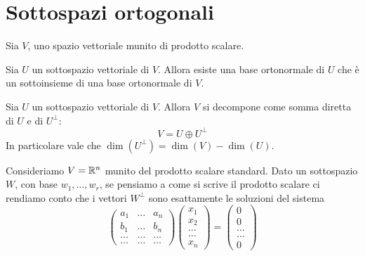 \section{Sottospazi ortogonali}
Sia $V$, uno spazio vettoriale munito di prodotto scalare.

\begin{proposition}
	Sia $U$ un sottospazio vettoriale di $V$. Allora esiste una base
	ortonormale di $U$ che è un sottoinsieme di una base ortonormale di $V$.
\end{proposition}

\begin{theorem}
	Sia $U$ un sottospazio vettoriale di $V$. Allora $V$ si decompone come
	somma diretta di $U$ e di $U^\perp$:
	\[
		V = U \oplus U^\perp
	\]
	In particolare vale che $\dim(U^\perp) = \dim(V) - \dim(U)$.
\end{theorem}

\begin{observation}
	Consideriamo $V = \mathbb{R}^n$ munito del prodotto scalare standard. Dato
	un sottospazio $W$, con base $w_1, \dots, w_r$, se pensiamo a come si
	scrive il prodotto scalare ci rendiamo conto che i vettori $W^\perp$ sono
	esattamente le soluzioni del sistema
	\[
		\begin{pmatrix}
			a_1   & \dots & a_n   \\
			b_1   & \dots & b_n   \\
			\dots & \dots & \dots \\
			\dots & \dots & \dots
		\end{pmatrix}
		\begin{pmatrix}
			x_1 \\ x_2 \\ \dots \\ \dots \\ x_n
		\end{pmatrix} =
		\begin{pmatrix}
			0 \\ 0 \\ \dots \\ \dots \\ 0
		\end{pmatrix}
	\]
\end{observation}